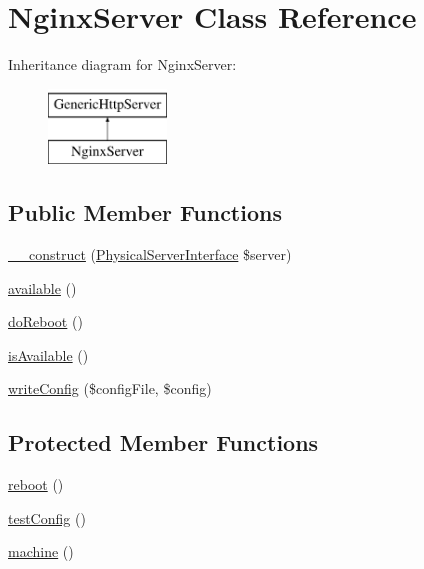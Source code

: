 \hypertarget{classNginxServer}{\section{Nginx\-Server Class Reference}
\label{classNginxServer}
}
Inheritance diagram for Nginx\-Server\-:\begin{figure}[H]
\begin{center}
\leavevmode
\includegraphics[height=2.000000cm]{classNginxServer}
\end{center}
\end{figure}
\subsection*{Public Member Functions}
\begin{DoxyCompactItemize}
\item 
\hyperlink{classNginxServer_a38945327f15d747ee7ff27e981cfa072}{\-\_\-\-\_\-construct} (\hyperlink{interfacePhysicalServerInterface}{Physical\-Server\-Interface} \$server)
\item 
\hyperlink{classNginxServer_a28f857d1f2d7663b0d8405e8f9e951d4}{available} ()
\item 
\hyperlink{classGenericHttpServer_aadaefaa2c7866c61b6e5c47f5ba9cb52}{do\-Reboot} ()
\item 
\hyperlink{classGenericHttpServer_a09f17032d29735f1e4ebcf0b8a8e110f}{is\-Available} ()
\item 
\hyperlink{classGenericHttpServer_a31f8dd33820bd62522382f5b6b0117c5}{write\-Config} (\$config\-File, \$config)
\end{DoxyCompactItemize}
\subsection*{Protected Member Functions}
\begin{DoxyCompactItemize}
\item 
\hyperlink{classNginxServer_a6b71a2087f325a266f2386669a253385}{reboot} ()
\item 
\hyperlink{classNginxServer_a1764697e9bcf42f83b3e90237140ac69}{test\-Config} ()
\item 
\hyperlink{classGenericHttpServer_a5a3529075164ac5fd6ed20753fb14629}{machine} ()
\end{DoxyCompactItemize}


